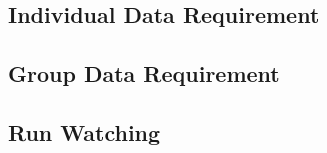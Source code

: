 \subsection{Individual Data Requirement}

\clearpage

\subsection{Group Data Requirement}

\clearpage

\subsection{Run Watching}

\clearpage
